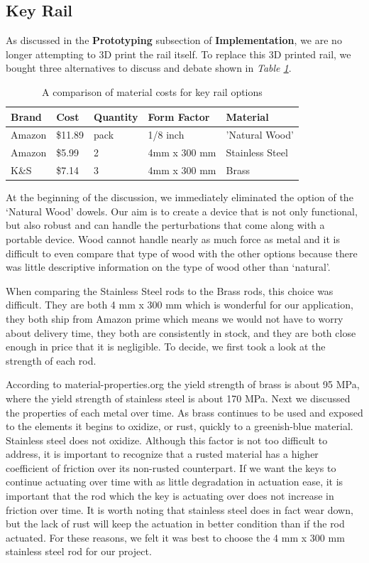\subsection{Key Rail}

As discussed in the \textbf{Prototyping} subsection of \textbf{Implementation}, we are no longer attempting to 3D print the rail itself. To replace this 3D printed rail, we bought three alternatives to discuss and debate shown in \textit{Table \ref{Tab:rail_brand}}.

\begin{table}[]
  \centering
  \begin{tabular}{|l|l|l|l|l|}
    \hline
    Brand  & Cost    & Quantity & Form Factor  & Material        \\ \hline
    Amazon & \$11.89 & pack     & 1/8 inch     & 'Natural Wood'  \\ \hline
    Amazon & \$5.99  & 2        & 4mm x 300 mm & Stainless Steel \\ \hline
    K\&S   & \$7.14  & 3        & 4mm x 300 mm & Brass           \\ \hline
  \end{tabular}
  \caption{A comparison of material costs for key rail options}
  \label{Tab:rail_brand}
\end{table}

At the beginning of the discussion, we immediately eliminated the option of the ‘Natural Wood’ dowels. Our aim is to create a device that is not only functional, but also robust and can handle the perturbations that come along with a portable device. Wood cannot handle nearly as much force as metal and it is difficult to even compare that type of wood with the other options because there was little descriptive information on the type of wood other than ‘natural’.

When comparing the Stainless Steel rods to the Brass rods, this choice was difficult. They are both 4 mm x 300 mm which is wonderful for our application, they both ship from Amazon prime which means we would not have to worry about delivery time, they both are consistently in stock, and they are both close enough in price that it is negligible. To decide, we first took a look at the strength of each rod.

According to material-properties.org the yield strength of brass is about 95 MPa, where the yield strength of stainless steel is about 170 MPa. Next we discussed the properties of each metal over time. As brass continues to be used and exposed to the elements it begins to oxidize, or rust, quickly to a greenish-blue material. Stainless steel does not oxidize. Although this factor is not too difficult to address, it is important to recognize that a rusted material has a higher coefficient of friction over its non-rusted counterpart. If we want the keys to continue actuating over time with as little degradation in actuation ease, it is important that the rod which the key is actuating over does not increase in friction over time. It is worth noting that stainless steel does in fact wear down, but the lack of rust will keep the actuation in better condition than if the rod actuated. For these reasons, we felt it was best to choose the 4 mm x 300 mm stainless steel rod for our project.

